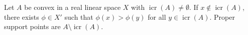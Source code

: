 Let $A$ be convex in a real linear space $X$ with $\operatorname{icr}(A)\neq\emptyset$. If $x\notin\operatorname{icr}(A)$, there exists $\phi\in X'$ such that $\phi(x)>\phi(y)$ for all $y\in\operatorname{icr}(A)$. Proper support points are $A\setminus\operatorname{icr}(A)$.
